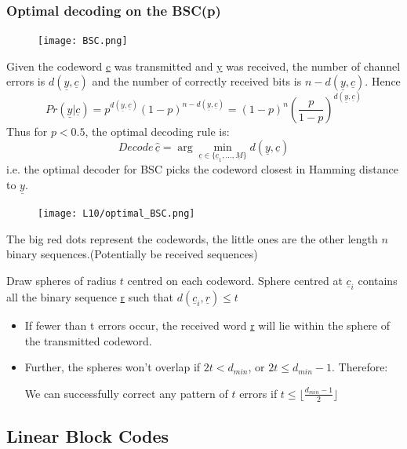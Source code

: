 \documentclass[12pt]{article}
\begin{document}
\subsubsection{Optimal decoding on the BSC(p)}
\begin{figure}[H]
    \centering
    \texttt{[image: BSC.png]}
\end{figure}
Given the codeword \underline{c} was transmitted and \underline{y} was received, the number of channel errors is $d(\underline{y},\underline{c})$ and the number of correctly received bits is $n - d(\underline{y},\underline{c})$. Hence
\[
Pr(\underline{y}|\underline{c}) = p^{d(\underline{y},\underline{c})}(1-p)^{n-d(\underline{y},\underline{c})}=(1-p)^n\left(\frac{p}{1-p}\right)^{d(\underline{y},\underline{c})}
\]
Thus for $p<0.5$, the optimal decoding rule is:
\[
Decode \, \underline{\hat{c}} = \arg \min_{\underline{c}\in \{\underline{c}_1,...,\underline{M}\}}d(\underline{y},\underline{c})
\]
i.e. the optimal decoder for BSC picks the codeword closest in Hamming distance to $\underline{y}$.
\begin{figure}[H]
    \centering
    \texttt{[image: L10/optimal\_BSC.png]}
\end{figure}
The big red dots represent the codewords, the little ones are the other length $n$ binary sequences.(Potentially be received sequences)

Draw spheres of radius $t$ centred on each codeword. Sphere centred at $\underline{c}_i$ contains all the binary sequence \underline{r} such that $d(\underline{c}_i,\underline{r}) \le t$
\begin{itemize}
    \item If fewer than t errors occur, the received word \underline{r} will lie within the sphere of the transmitted codeword.
    \item Further, the spheres won't overlap if $2t<d_{min}$, or $2t\le d_{min}-1$. Therefore:
    \begin{center}
        {\large We can successfully correct any pattern of $t$ errors if $t\le \lfloor\frac{d_{min}-1}{2}\rfloor$}
    \end{center}
\end{itemize}
\subsection{Linear Block Codes}
\end{document}
